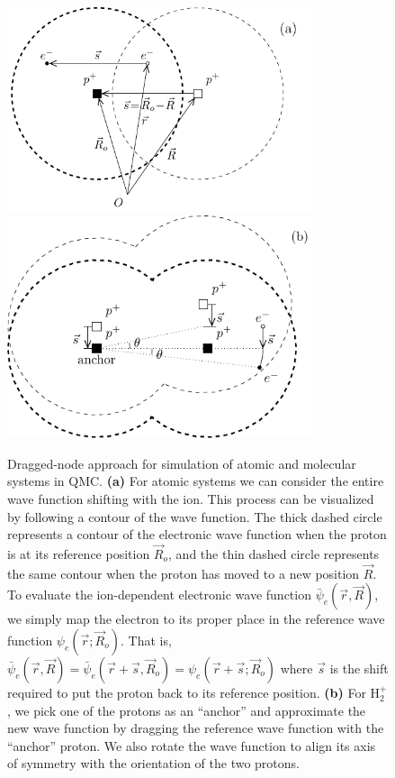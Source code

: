 \documentclass[aip,jcp,numerical,reprint]{revtex4-1}
\begin{document}
\begin{figure}[h]
\includegraphics[width=9cm]{fig1a}
\includegraphics[width=9cm]{fig1b}
\caption{Dragged-node approach for simulation of atomic and molecular systems in QMC. {\bf (a)} For atomic systems we can consider the entire wave function shifting with the ion. This process can be visualized by following a contour of the wave function. The thick dashed circle represents a contour of the electronic wave function when the proton is at its reference position $\vec{R}_o$, and the thin dashed circle represents the same contour when the proton has moved to a new position $\vec{R}$. To evaluate the ion-dependent electronic wave function $\bar{\psi}_e(\vec{r},\vec{R})$, we simply map the electron to its proper place in the reference wave function $\psi_e(\vec{r};\vec{R}_o)$. That is, $\bar{\psi}_e(\vec{r},\vec{R})=\bar{\psi}_e(\vec{r}+\vec{s},\vec{R}_o)=\psi_e(\vec{r}+\vec{s};\vec{R}_o)$ where $\vec{s}$ is the shift required to put the proton back to its reference position. {\bf (b)} For H$_2^+$, we pick one of the protons as an ``anchor'' and approximate the new wave function by dragging the reference wave function with the ``anchor'' proton. We also rotate the wave function to align its axis of symmetry with the orientation of the two protons. \label{fig:drag}}
\end{figure}
\end{document}
